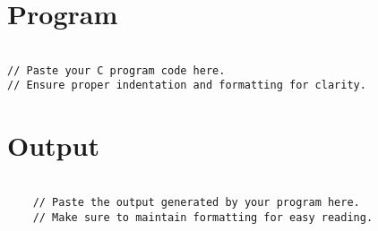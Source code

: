 \documentclass{article}
\begin{document}
\section*{Program}
\begin{verbatim}

// Paste your C program code here.
// Ensure proper indentation and formatting for clarity.

\end{verbatim}








\section*{Output}
\begin{verbatim}

    // Paste the output generated by your program here.
    // Make sure to maintain formatting for easy reading.

\end{verbatim}
\end{document}
